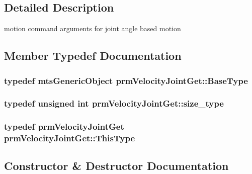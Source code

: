 \subsection{Detailed Description}
motion command arguments for joint angle based motion 

\subsection{Member Typedef Documentation}
\hypertarget{classprm_velocity_joint_get_ad043b0f13500d770bef8eca12241e581}{}
\subsubsection[{Base\+Type}]{\setlength{\rightskip}{0pt plus 5cm}typedef {\bf mts\+Generic\+Object} {\bf prm\+Velocity\+Joint\+Get\+::\+Base\+Type}}\label{classprm_velocity_joint_get_ad043b0f13500d770bef8eca12241e581}
\hypertarget{classprm_velocity_joint_get_af8a1c509111e5ac2e38dfe32bc6d9914}{}
\subsubsection[{size\+\_\+type}]{\setlength{\rightskip}{0pt plus 5cm}typedef unsigned int {\bf prm\+Velocity\+Joint\+Get\+::size\+\_\+type}}\label{classprm_velocity_joint_get_af8a1c509111e5ac2e38dfe32bc6d9914}
\hypertarget{classprm_velocity_joint_get_a97c1b10ad949296590e6106c69e94d02}{}
\subsubsection[{This\+Type}]{\setlength{\rightskip}{0pt plus 5cm}typedef {\bf prm\+Velocity\+Joint\+Get} {\bf prm\+Velocity\+Joint\+Get\+::\+This\+Type}}\label{classprm_velocity_joint_get_a97c1b10ad949296590e6106c69e94d02}


\subsection{Constructor \& Destructor Documentation}
\hypertarget{classprm_velocity_joint_get_aadaa15924d96f4554b4c56c217a40ab9}{}
